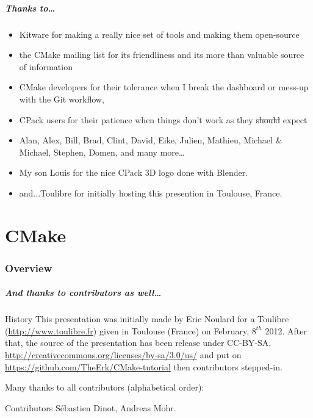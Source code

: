 \documentclass[compress,slidestop,table,usepdftitle=false
              ]
               {beamer}
\begin{document}
\begin{frame}
\frametitle{Thanks to\ldots}
\begin{itemize}
\item \textcolor{cmakeblue}{Kitware for making a really nice set of tools and making them open-source}
\item \textcolor{cmakered}{the CMake mailing list for its friendliness and its more than valuable source of information}
\item \textcolor{cmakegreen}{CMake developers for their tolerance when I break the dashboard or mess-up
      with the Git workflow,}
\item \textcolor{cmakeblue}{CPack users for their patience when things don't work as they \sout{should} expect}
\item \textcolor{cmakeblue}{Alan},
      \textcolor{cmakered}{Alex},
      \textcolor{cmakegreen}{Bill},
      \textcolor{cmakeblue}{Brad},
      \textcolor{cmakered}{Clint},
      \textcolor{cmakegreen}{David},
      \textcolor{cmakeblue}{Eike},
      \textcolor{cmakered}{Julien},
      \textcolor{cmakegreen}{Mathieu},
      \textcolor{cmakeblue}{Michael \& Michael},
      \textcolor{cmakered}{Stephen},
      \textcolor{cmakegreen}{Domen},
      \textcolor{cmakeblue}{and}  \textcolor{cmakered}{many} \textcolor{cmakegreen}{more}\ldots
\item \textcolor{cmakegreen}{My son Louis for the nice CPack 3D logo done with Blender.}
\item \textcolor{cmakered}{and...Toulibre for initially hosting this presention in Toulouse, France.}
\end{itemize}
\end{frame}

\part{CMake}

\section{Overview}

\begin{frame}
\frametitle{And thanks to contributors as well\ldots}

{%
\begin{block}{History}
\fontsize{9pt}{11}\selectfont
This presentation  was initially made  by Eric Noulard for  a Toulibre
(\url{http://www.toulibre.fr}) given in Toulouse (France) on February,
$8^{th}$ 2012.  After that,  the source of  the presentation  has been
release                         under                        CC-BY-SA,
\url{http://creativecommons.org/licenses/by-sa/3.0/us/} and put on
\url{https://github.com/TheErk/CMake-tutorial} then contributors
stepped-in.
\end{block}
{\normalsize
Many thanks to all contributors (alphabetical order):
}
\begin{block}{Contributors}
 \fontsize{9pt}{11}\selectfont
 \textcolor{cmakeblue}{Sébastien Dinot},
 \textcolor{cmakered}{Andreas Mohr}.
\end{block}
}
\end{frame}
\end{document}
